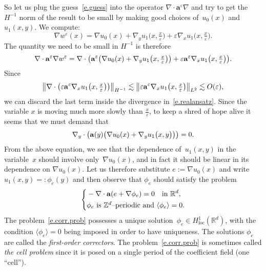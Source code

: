 \documentclass[11pt]{article} %
\numberwithin{equation}{section}
\theoremstyle{definition}
\let\originalleft\left
\let\originalright\right
\renewcommand{\left}{\mathopen{}\mathclose\bgroup\originalleft}
\renewcommand{\right}{\aftergroup\egroup\originalright}
\newcommand*{\Z}{\ensuremath{\mathbb{Z}}}
\newcommand*{\R}{\ensuremath{\mathbb{R}}}
\newcommand*{\Rd}{\ensuremath{\mathbb{R}^d}}
\newcommand{\eps}{\varepsilon}
\newcommand{\ep}{\eps}
\renewcommand{\a}{\mathbf{a}}
\begin{document}
\smallskip

So let us plug the guess~\eqref{e.guess} into the operator $\nabla \cdot \a^\ep\nabla$ and try to get the~$H^{-1}$ norm of the result to be small by making good choices of~$u_0(x)$ and~$u_1(x,y)$. We compute:
\begin{equation}
\nabla w^\ep(x) = 
\nabla u_0(x) 
+ \nabla_y u_1\bigl(x,\tfrac x\ep \bigr)
+ \ep \nabla_xu_1\bigl(x,\tfrac x\ep \bigr).
\end{equation}
The quantity we need to be small in $H^{-1}$ is therefore
\begin{equation}
\label{e.realansatz}
\nabla \cdot \a^\ep \nabla w^\ep 
=
\nabla \cdot \left( 
\a^\ep \left( 
\nabla u_0(x) 
+ \nabla_y u_1\bigl(x,\tfrac x\ep \bigr)
\right)
+ \ep \a^\ep \nabla_xu_1\bigl(x,\tfrac x\ep \bigr)
\right).
\end{equation}
Since
\begin{equation}
\label{e.Oeps}
\left\| \nabla \cdot \left( \ep \a^\ep \nabla_xu_1\bigl(x,\tfrac x\ep \bigr)
\right) \right\|_{H^{-1}} 
\lesssim
\left\|  \ep \a^\ep \nabla_xu_1\bigl(x,\tfrac x\ep \bigr)
\right\|_{L^2} 
\lesssim O(\ep), 
\end{equation}
we can discard the last term inside the divergence in~\eqref{e.realansatz}. 
Since the variable $x$ is moving much more slowly than $\frac x\ep$, to keep a shred of hope alive it seems that we must demand that
\begin{equation}
\nabla_y \cdot 
\left( 
\a(y) \left( 
\nabla u_0(x) 
+ \nabla_y u_1\bigl(x,y \bigr)
\right)\right)
= 0 . 
\end{equation}
From the above equation, we see that the dependence of~$u_1(x,y)$ in the variable~$x$ should involve only~$\nabla u_0(x)$, and in fact it should be linear in its dependence on $\nabla u_0(x)$. Let us therefore substitute $e:= \nabla u_0(x)$ and write $u_1(x,y) =: \phi_e(y)$ and then observe that $\phi_e$ should satisfy the problem
\begin{equation}
\label{e.corr.prob}
\left\{
\begin{aligned}
&-\nabla \cdot \a \left( e + \nabla \phi_e  \right) = 0 \quad \mbox{in}  \ \R^d, \\
& \phi_e  \ \mbox{is $\Z^d$--periodic and} \ \langle \phi_e  \rangle = 0. 
\end{aligned}
\right.
\end{equation}
The problem~\eqref{e.corr.prob} possesses a unique solution~$\phi_e\in H^1_{\mathrm{loc}}(\Rd)$, with the condition $\langle \phi_e  \rangle = 0$ being imposed in order to have uniqueness. The solutions $\phi_e$ are called the \emph{first-order correctors}. The problem~\eqref{e.corr.prob} is sometimes called \emph{the cell problem} since it is posed on a single period of the coefficient field (one  ``cell'').
\end{document}
